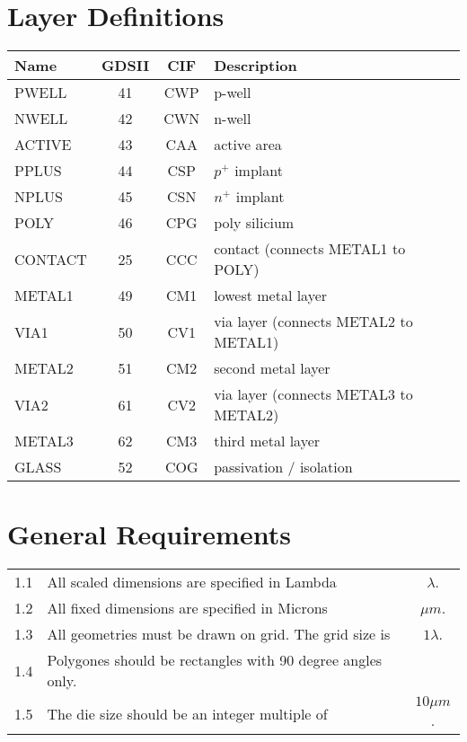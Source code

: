 \section{Layer Definitions}\label{design_rules_layer_definitions}

\begin{center}
    \begin{tabular}{|l|c|c|p{7.5cm}|}
    \hline
        \textbf{Name} & \textbf{GDSII} & \textbf{CIF} & \textbf{Description} \\
    \hline
        PWELL   & 41 & CWP & p-well \\
        NWELL   & 42 & CWN & n-well \\
        ACTIVE  & 43 & CAA & active area \\
        PPLUS   & 44 & CSP & $p^{+}$ implant \\
        NPLUS   & 45 & CSN & $n^{+}$ implant \\
        POLY    & 46 & CPG & poly silicium \\
        CONTACT & 25 & CCC & contact (connects METAL1 to POLY) \\
        METAL1  & 49 & CM1 & lowest metal layer \\
        VIA1    & 50 & CV1 & via layer (connects METAL2 to METAL1) \\
        METAL2  & 51 & CM2 & second metal layer \\
        VIA2    & 61 & CV2 & via layer (connects METAL3 to METAL2) \\
        METAL3  & 62 & CM3 & third metal layer \\
        GLASS   & 52 & COG & passivation / isolation \\
    \hline
    \end{tabular}
\end{center}

\section{General Requirements}\label{design_rules_general_requirements}

\begin{flushleft}
    \begin{tabular}{c p{9cm} c}
        1.1  & All scaled dimensions are specified in Lambda & $\lambda$. \\
        1.2  & All fixed dimensions are specified in Microns & $\mu m$. \\
        1.3  & All geometries must be drawn on grid. The grid size is & $1 \lambda$. \\
        1.4  & Polygones should be rectangles with 90 degree angles only. \\
        1.5  & The die size should be an integer multiple of & $10 \mu m$. \\
    \end{tabular}
\end{flushleft}

